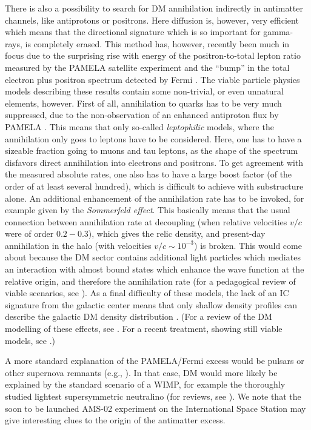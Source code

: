 \documentclass[10pt,aps,pra,reprint,amsmath,amsfonts,amssymb,showpacs,nofootinbib,floatfix]{revtex4-1}
\begin{document}
There is also a possibility to search for DM annihilation indirectly
in antimatter channels, like antiprotons or positrons. Here diffusion
is, however, very efficient which means that the directional signature
which is so important for gamma-rays, is completely erased. This
method has, however, recently been much in focus due to the surprising
rise with energy of the positron-to-total lepton ratio measured by the
PAMELA satellite experiment \cite{Adriani:2008zr} and the ``bump'' in
the total electron plus positron spectrum detected by Fermi
\cite{Abdo:2009zk}. The viable particle physics models describing
these results contain some non-trivial, or even unnatural elements,
however. First of all, annihilation to quarks has to be very much
suppressed, due to the non-observation of an enhanced antiproton flux
by PAMELA \cite{Adriani:2010rc}. This means that only so-called {\em
  leptophilic} models, where the annihilation only goes to leptons
have to be considered. Here, one has to have a sizeable fraction going
to muons and tau leptons, as the shape of the spectrum disfavors
direct annihilation into electrons and positrons. To get agreement
with the measured absolute rates, one also has to have a large boost
factor (of the order of at least several hundred), which is difficult
to achieve with substructure alone. An additional enhancement of the
annihilation rate has to be invoked, for example given by the {\em
  Sommerfeld effect}. This basically means that the usual connection
between annihilation rate at decoupling (when relative velocities
$v/c$ were of order $0.2 - 0.3$), which gives the relic density, and
present-day annihilation in the halo (with velocities $v/c\sim
10^{-3}$) is broken. This would come about because the DM sector
contains additional light particles which mediates an interaction with
almost bound states which enhance the wave function at the relative
origin, and therefore the annihilation rate (for a pedagogical review
of viable scenarios, see \cite{ArkaniHamed:2008qn}). As a final
difficulty of these models, the lack of an IC signature from the
galactic center means that only shallow density profiles can describe
the galactic DM density distribution
\cite{Bertone:2008xr,Cirelli:2008pk,Bergstrom:2008ag}. (For a review
of the DM modelling of these effects, see \cite{Bergstrom:2009ib}. For
a recent treatment, showing still viable models, see
\cite{Finkbeiner:2010sm}.)

A more standard explanation of the PAMELA/Fermi excess would be
pulsars or other supernova remnants (e.g.,
\cite{Hooper:2008kg,Ahlers:2009ae}). In that case, DM would more
likely be explained by the standard scenario of a WIMP, for example
the thoroughly studied lightest supersymmetric neutralino (for
reviews, see
\cite{Jungman:1995df,Bergstrom:2000pn,Bertone:2004pz}). We note that
the soon to be launched AMS-02 experiment on the International Space
Station \cite{ams02} may give interesting clues to the origin of the
antimatter excess.
\end{document}

